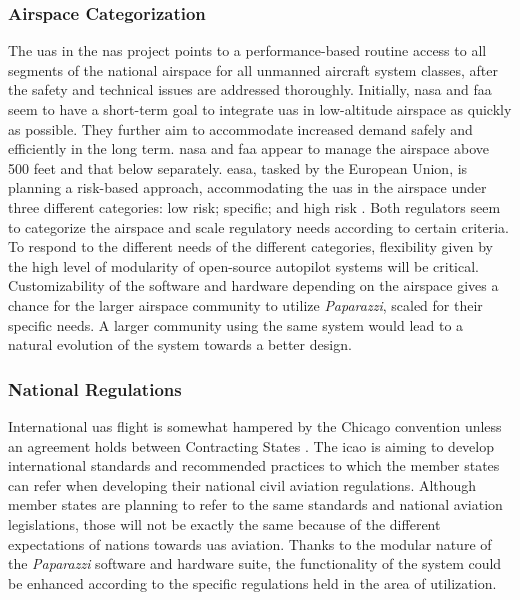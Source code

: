\subsubsection{Airspace Categorization}
The \gls{uas} in the \gls{nas} project points to a performance-based routine access to all segments of the national airspace for all unmanned aircraft system classes, after the safety and technical issues are addressed thoroughly. 
Initially, \gls{nasa} and \gls{faa} seem to have a short-term goal to integrate \gls{uas} in low-altitude airspace as quickly as possible. 
They further aim to accommodate increased demand safely and efficiently in the long term. \gls{nasa} and \gls{faa} appear to manage the airspace above 500 feet and that below separately. \gls{easa}, tasked by the European Union, is planning a risk-based approach, accommodating the \gls{uas} in the airspace under three different categories: low risk; specific; and high risk \cite{A_NPA_EASA2015}. Both regulators seem to categorize the airspace and scale regulatory needs according to certain criteria. To respond to the different needs of the different categories, flexibility given by the high level of modularity of open-source autopilot systems will be critical. 
Customizability of the software and hardware depending on the airspace gives a chance for the larger airspace community to utilize \emph{Paparazzi}, scaled for their specific needs. A larger community using the same system would lead to a natural evolution of the system towards a better design.

\subsubsection{National Regulations}
International \gls{uas} flight is somewhat hampered by the Chicago convention unless an agreement holds between Contracting States \cite{A_NPA_EASA2015}. The \gls{icao} is aiming to develop international standards and recommended practices to which the member states can refer when developing their national civil aviation regulations. Although member states are planning to refer to the same standards and national aviation legislations, those will not be exactly the same because of the different expectations of nations towards \gls{uas} aviation. Thanks to the modular nature of the \emph{Paparazzi} software and hardware suite, the functionality of the system could be enhanced according to the specific regulations held in the area of utilization.

